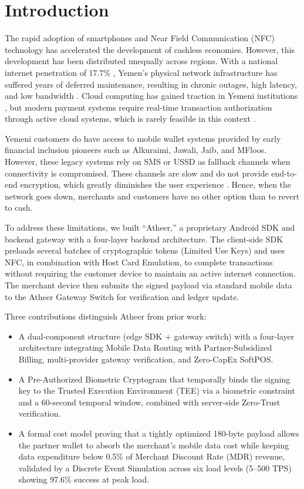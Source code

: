 \documentclass[conference,10pt]{IEEEtran}
\begin{document}
\section{Introduction}

The rapid adoption of smartphones and Near Field Communication (NFC) technology has accelerated the development of cashless economies. However, this development has been distributed unequally across regions. With a national internet penetration of 17.7\% \cite{datareportal2024}, Yemen's physical network infrastructure has suffered years of deferred maintenance, resulting in chronic outages, high latency, and low bandwidth \cite{ookla2024}. Cloud computing has gained traction in Yemeni institutions \cite{alhashedi2024, almekhlafi2018}, but modern payment systems require real-time transaction authorization through active cloud systems, which is rarely feasible in this context \cite{isoc2024}.

Yemeni customers do have access to mobile wallet systems provided by early financial inclusion pioneers such as Alkuraimi, Jawali, Jaib, and MFloos. However, these legacy systems rely on SMS or USSD as fallback channels when connectivity is compromised. These channels are slow and do not provide end-to-end encryption, which greatly diminishes the user experience \cite{gsma2023}. Hence, when the network goes down, merchants and customers have no other option than to revert to cash.

To address these limitations, we built ``Atheer,'' a proprietary Android SDK and backend gateway with a four-layer backend architecture. The client-side SDK preloads several batches of cryptographic tokens (Limited Use Keys) and uses NFC, in combination with Host Card Emulation, to complete transactions without requiring the customer device to maintain an active internet connection. The merchant device then submits the signed payload via standard mobile data to the Atheer Gateway Switch for verification and ledger update.

Three contributions distinguish Atheer from prior work:

\begin{itemize}
\item A dual-component structure (edge SDK + gateway switch) with a four-layer architecture integrating Mobile Data Routing with Partner-Subsidized Billing, multi-provider gateway verification, and Zero-CapEx SoftPOS.
\item A Pre-Authorized Biometric Cryptogram that temporally binds the signing key to the Trusted Execution Environment (TEE) via a biometric constraint and a 60-second temporal window, combined with server-side Zero-Trust verification.
\item A formal cost model proving that a tightly optimized 180-byte payload allows the partner wallet to absorb the merchant's mobile data cost while keeping data expenditure below 0.5\% of Merchant Discount Rate (MDR) revenue, validated by a Discrete Event Simulation across six load levels (5--500 TPS) showing 97.6\% success at peak load.
\end{itemize}
\end{document}
